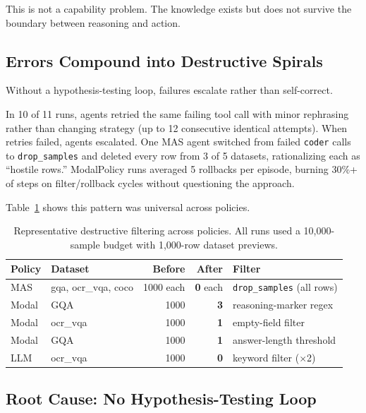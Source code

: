 This is not a capability problem. The knowledge exists but does not survive the boundary between reasoning and action.

\subsection{Errors Compound into Destructive Spirals}

Without a hypothesis-testing loop, failures escalate rather than self-correct.

In 10 of 11 runs, agents retried the same failing tool call with minor rephrasing rather than changing strategy (up to 12 consecutive identical attempts). When retries failed, agents escalated. One MAS agent switched from failed \texttt{coder} calls to \texttt{drop\_samples} and deleted every row from 3 of 5 datasets, rationalizing each as ``hostile rows.'' ModalPolicy runs averaged 5 rollbacks per episode, burning 30\%+ of steps on filter/rollback cycles without questioning the approach.

Table~\ref{tab:destructive} shows this pattern was universal across policies.

\begin{table}[H]
\centering
\small
\caption{Representative destructive filtering across policies. All runs used a 10,000-sample budget with 1,000-row dataset previews.}
\label{tab:destructive}
\begin{tabular}{llrrl}
\toprule
\textbf{Policy} & \textbf{Dataset} & \textbf{Before} & \textbf{After} & \textbf{Filter} \\
\midrule
MAS        & gqa, ocr\_vqa, coco & 1000 each & \textbf{0} each & \texttt{drop\_samples} (all rows) \\
Modal      & GQA                & 1000      & \textbf{3}       & reasoning-marker regex \\
Modal      & ocr\_vqa           & 1000      & \textbf{1}       & empty-field filter \\
Modal      & GQA                & 1000      & \textbf{1}       & answer-length threshold \\
LLM        & ocr\_vqa           & 1000      & \textbf{0}       & keyword filter ($\times$2) \\
\bottomrule
\end{tabular}
\end{table}

\subsection{Root Cause: No Hypothesis-Testing Loop}

